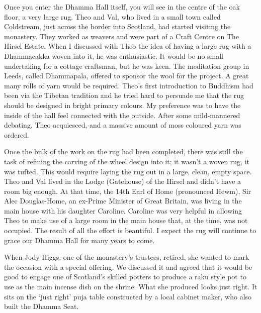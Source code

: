 Once you enter the Dhamma Hall itself, you will see in the centre of the
oak floor, a very large rug. Theo and Val, who lived in a small town
called Coldstream, just across the border into Scotland, had started
visiting the monastery. They worked as weavers and were part of a Craft
Centre on The Hirsel Estate\cite{hirsel}. When I discussed with Theo the
idea of having a large rug with a Dhammacakka woven into it, he was
enthusiastic. It would be no small undertaking for a cottage craftsman,
but he was keen. The meditation group in Leeds, called Dhammapala,
offered to sponsor the wool for the project. A great many rolls of yarn
would be required. Theo's first introduction to Buddhism had been via
the Tibetan tradition and he tried hard to persuade me that the rug
should be designed in bright primary colours. My preference was to have
the inside of the hall feel connected with the outside. After some
mild-mannered debating, Theo acquiesced, and a massive amount of moss
coloured yarn was ordered.

Once the bulk of the work on the rug had been completed, there was still
the task of refining the carving of the wheel design into it; it wasn't
a woven rug, it was tufted. This would require laying the rug out in a
large, clean, empty space. Theo and Val lived in the Lodge (Gatehouse)
of the Hirsel and didn't have a room big enough. At that time, the
14th Earl of Home\cite{earl} (pronounced Hewm), Sir Alec Douglas-Home, an ex-Prime
Minister of Great Britain, was living in the main house with his
daughter Caroline. Caroline was very helpful in allowing Theo to make
use of a large room in the main house that, at the time, was not
occupied. The result of all the effort is beautiful. I expect the rug
will continue to grace our Dhamma Hall for many years to come.

When Jody Higgs, one of the monastery's trustees, retired, she wanted to
mark the occasion with a special offering. We discussed it and agreed
that it would be good to engage one of Scotland's skilled potters to
produce a raku\cite{raku} style pot to use as the main incense dish
on the shrine. What
she produced looks just right. It sits on the `just right' puja table
constructed by a local cabinet maker, who also built the Dhamma Seat.

